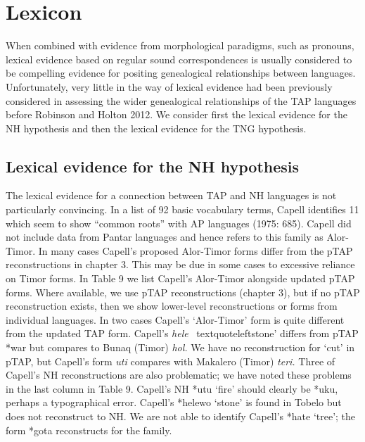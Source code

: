 \section[Lexicon]{Lexicon}
\hypertarget{RefHeading72074871885726}{}When combined with evidence from morphological paradigms, such as pronouns, lexical evidence based on regular sound correspondences is usually considered to be compelling evidence for positing genealogical relationships between languages. Unfortunately, very little in the way of lexical evidence had been previously considered in assessing the wider genealogical relationships of the TAP languages before Robinson and Holton 2012. We consider first the lexical evidence for the NH hypothesis and then the lexical evidence for the TNG hypothesis.

\subsection[Lexical evidence for the NH hypothesis]{Lexical evidence for the NH hypothesis}
\hypertarget{RefHeading72076871885726}{}The lexical evidence for a connection between TAP and NH languages is not particularly convincing. In a list of 92 basic vocabulary terms, Capell identifies 11 which seem to show {\textquotedblleft}common roots{\textquotedblright} with AP languages (1975: 685). Capell did not include data from Pantar languages and hence refers to this family as Alor-Timor. In many cases Capell{\textquoteright}s proposed Alor-Timor forms differ from the pTAP reconstructions in chapter 3. This may be due in some cases to excessive reliance on Timor forms. In Table 9 we list Capell{\textquoteright}s Alor-Timor alongside updated pTAP forms. Where available, we use pTAP reconstructions (chapter 3), but if no pTAP reconstruction exists, then we show lower-level reconstructions or forms from individual languages. In two cases Capell{\textquoteright}s {\textquoteleft}Alor-Timor{\textquoteright} form is quite different from the updated TAP form. Capell{\textquoteright}s \textit{hele} {\
textquoteleft}stone{\textquoteright} differs from pTAP *war but compares to Bunaq (Timor) \textit{hol. }We have no reconstruction for {\textquoteleft}cut{\textquoteright} in pTAP, but Capell{\textquoteright}s form \textit{uti }compares with Makalero (Timor) \textit{teri. }Three of Capell{\textquoteright}s NH reconstructions are also problematic; we have noted these problems in the last column in Table 9. Capell{\textquoteright}s NH *utu\textit{ }{\textquoteleft}fire{\textquoteright} should clearly be *uku, perhaps a typographical error. Capell{\textquoteright}s *helewo {\textquoteleft}stone{\textquoteright} is found in Tobelo but does not reconstruct to NH. We are not able to identify Capell{\textquoteright}s *hate {\textquoteleft}tree{\textquoteright}; the form *gota reconstructs for the family.

